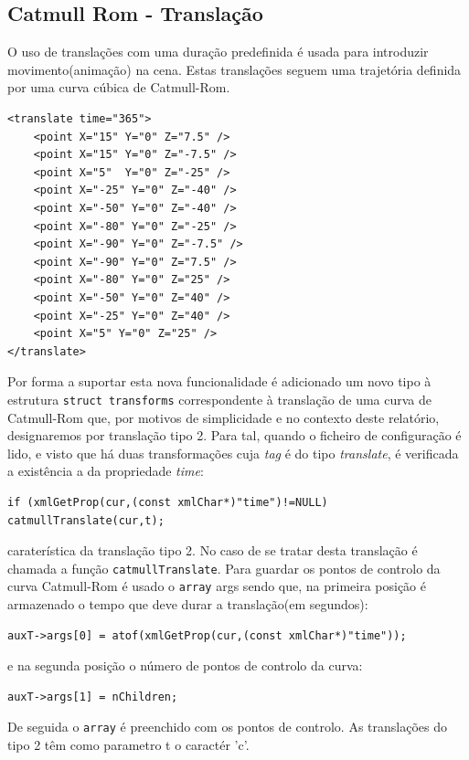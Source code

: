 \documentclass{article}
\begin{document}
\subsection{Catmull Rom - Translação}
O uso de translações com uma duração predefinida é usada para introduzir movimento(animação) na cena. Estas translações seguem uma trajetória definida por uma curva cúbica de Catmull-Rom.
\begin{verbatim}
<translate time="365">
    <point X="15" Y="0" Z="7.5" />
    <point X="15" Y="0" Z="-7.5" />
    <point X="5"  Y="0" Z="-25" />
    <point X="-25" Y="0" Z="-40" />
    <point X="-50" Y="0" Z="-40" />
    <point X="-80" Y="0" Z="-25" />
    <point X="-90" Y="0" Z="-7.5" />
    <point X="-90" Y="0" Z="7.5" />
    <point X="-80" Y="0" Z="25" />
    <point X="-50" Y="0" Z="40" />
    <point X="-25" Y="0" Z="40" />
    <point X="5" Y="0" Z="25" />
</translate>
\end{verbatim}
Por forma a suportar esta nova funcionalidade é adicionado um novo tipo à estrutura \texttt{struct transforms} correspondente à translação de uma curva de Catmull-Rom que, por motivos de simplicidade e no contexto deste relatório, designaremos por translação tipo 2.
Para tal, quando o ficheiro de configuração é lido, e visto que há duas transformações cuja \textit{tag} é do tipo \textit{translate}, é verificada a existência a
da propriedade \textit{time}: 
\begin{verbatim}
if (xmlGetProp(cur,(const xmlChar*)"time")!=NULL) catmullTranslate(cur,t);
\end{verbatim}
caraterística da translação tipo 2. No caso de se tratar desta translação é chamada a função \texttt{catmullTranslate}.
Para guardar os pontos de controlo da curva Catmull-Rom é usado o \texttt{array} args sendo que, na primeira posição é armazenado o tempo que deve durar a translação(em segundos): 
\begin{verbatim}
auxT->args[0] = atof(xmlGetProp(cur,(const xmlChar*)"time")); 
\end{verbatim}
e na segunda posição o número de pontos de controlo  da curva: 
\begin{verbatim}
auxT->args[1] = nChildren;
\end{verbatim}
De seguida o \texttt{array} é preenchido com os pontos de controlo. As translações do tipo 2 têm como parametro t o caractér 'c'.
\end{document}
